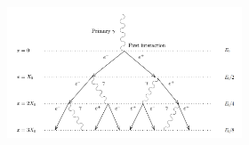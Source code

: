 \begin{figure}
\begin{figure}
	\centering
	\captionsetup{width=0.9\linewidth}
	\begin{subfigure}{.7\textwidth}
  		\centering
  		\includegraphics[width=\linewidth]{images/em_shower_illustration.png}
	\end{subfigure}%
	\begin{subfigure}{.2\textwidth}
 		\centering

\end{subfigure}
\end{figure}
\end{figure}
